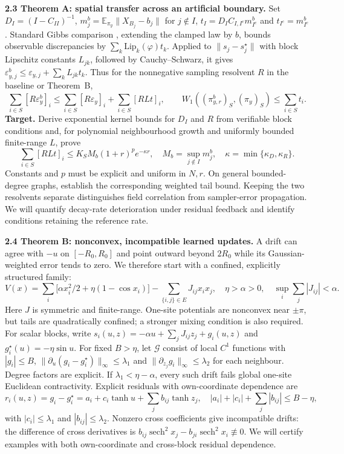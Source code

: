 \documentclass[12pt,a4paper]{article}
\newcommand{\E}{\mathbb E}
\newcommand{\W}{W_1}
\newcommand{\piy}{\pi_y}
\newcommand{\pir}{\pi_{y,r}^{b}}
\newcommand{\epsb}{\varepsilon^{b}_{y}}
\newcommand{\epsy}{\varepsilon_{y}}
\begin{document}
\textbf{2.3 Theorem A: spatial transfer across an artificial boundary.}
Set $D_I=(I-C_{II})^{-1}$, $m_j^b=\E_{\piy}\|X_{B_j}-b_j\|$ for $j\notin I$, $t_I=D_I C_{I,I^c}m_{I^c}^b$ and $t_{I^c}=m_{I^c}^b$. Standard Gibbs comparison \cite{RvH14}, extending the clamped law by $b$, bounds observable discrepancies by $\sum_k\mathrm{Lip}_k(\varphi)t_k$. Applied to $\|s_j-s_j^\star\|$ with block Lipschitz constants $L_{jk}$, followed by Cauchy--Schwarz, it gives $\varepsilon^b_{y,j}\leq\varepsilon_{y,j}+\sum_kL_{jk}t_k$. Thus for the nonnegative sampling resolvent $R$ in the baseline or Theorem~B,
\begin{equation}\label{eq:transfer}
 \sum_{i\in S}[R\epsb]_i\leq\sum_{i\in S}[R\epsy]_i+\sum_{i\in S}[RLt]_i,
 \qquad \W((\pir)_S,(\piy)_S)\leq\sum_{i\in S}t_i.
\end{equation}
\textbf{Target.} Derive exponential kernel bounds for $D_I$ and $R$ from verifiable block conditions and, for polynomial neighbourhood growth and uniformly bounded finite-range $L$, prove
\begin{equation}\label{eq:thmA}
 \sum_{i\in S}[RLt]_i\leq K_SM_b(1+r)^p e^{-\kappa r},\quad
 M_b=\sup_{j\notin I}m_j^b,\quad \kappa=\min\{\kappa_D,\kappa_R\}.
\end{equation}
Constants and $p$ must be explicit and uniform in $N,r$. On general bounded-degree graphs, establish the corresponding weighted tail bound. Keeping the two resolvents separate distinguishes field correlation from sampler-error propagation. We will quantify decay-rate deterioration under residual feedback and identify conditions retaining the reference rate.

\textbf{2.4 Theorem B: nonconvex, incompatible learned updates.}
A drift can agree with $-u$ on $[-R_0,R_0]$ and point outward beyond $2R_0$ while its Gaussian-weighted error tends to zero. We therefore start with a confined, explicitly structured family:
\begin{equation}\label{eq:potential}
 V(x)=\sum_i\bigl[\alpha x_i^2/2+\eta(1-\cos x_i)\bigr]
 -\sum_{\{i,j\}\in E}J_{ij}x_ix_j,
 \quad \eta>\alpha>0,\quad\sup_i\sum_j|J_{ij}|<\alpha.
\end{equation}
Here $J$ is symmetric and finite-range. One-site potentials are nonconvex near $\pm\pi$, but tails are quadratically confined; a stronger mixing condition is also required. For scalar blocks, write $s_i(u,z)=-\alpha u+\sum_jJ_{ij}z_j+g_i(u,z)$ and $g_i^\star(u)=-\eta\sin u$. For fixed $B>\eta$, let $\mathcal G$ consist of local $C^1$ functions with $|g_i|\leq B$, $\|\partial_u(g_i-g_i^\star)\|_\infty\leq\lambda_1$ and $\|\partial_{z_j}g_i\|_\infty\leq\lambda_2$ for each neighbour. Degree factors are explicit. If $\lambda_1<\eta-\alpha$, every such drift fails global one-site Euclidean contractivity.
Explicit residuals with own-coordinate dependence are
\[
 r_i(u,z)=g_i-g_i^\star=a_i+c_i\tanh u+\sum_j b_{ij}\tanh z_j,
 \quad |a_i|+|c_i|+\sum_j|b_{ij}|\leq B-\eta,
\]
with $|c_i|\leq\lambda_1$ and $|b_{ij}|\leq\lambda_2$. Nonzero cross coefficients give incompatible drifts: the difference of cross derivatives is $b_{ij}\operatorname{sech}^2x_j-b_{ji}\operatorname{sech}^2x_i\not\equiv0$. We will certify examples with both own-coordinate and cross-block residual dependence.
\end{document}
